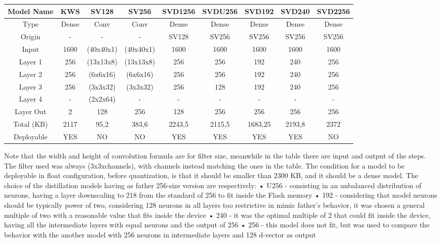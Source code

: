 \begin{table}[!h]
\centering
    \begin{tabular}{|c|c|c|c|c|c|c|c|c|}
        \hline
        Model Name & KWS & SV128 & SV256 & SVD1256 & SVDU256 & SVD192 & SVD240 & SVD2256\\
        \hline
        Type & Dense & Conv & Conv & Dense & Dense & Dense & Dense & Dense\\
        Origin & - & - &  - & SV128 & SV256 & SV256 & SV256 & SV256\\
        Input & 1600 & (40x40x1) & (40x40x1) & 1600 & 1600 & 1600 & 1600 & 1600\\
        Layer 1 & 256 & (13x13x8) & (13x13x8) & 256 & 256 & 192 & 240 & 256\\
        Layer 2 & 256 & (6x6x16) & (6x6x16) & 256 & 256 & 192 & 240 & 256\\
        Layer 3 & 256 & (3x3x32) & (3x3x32) & 256 & 128 & 192 & 240 & 256\\
        Layer 4 & - & (2x2x64) & - & - & - & - & - & -\\
        Layer Out & 2 & 128 & 256 & 128 & 256 & 256 & 256 & 256\\
        Total (KB) & 2117 & 95,2 & 383,6 & 2243,5 & 2115,5 & 1683,25 & 2193,8 & 2372\\
        Deployable & YES & NO & NO & YES & YES & YES & YES & NO\\
        \hline
    \end{tabular}
\end{table}
Note that the width and height of convolution formula are for filter size, meanwhile in the table there are input and output of the steps. The filter used was always (3x3xchannels), with channels instead matching the ones in the table. The condition for a model to be deployable in float configuration, before quantization, is that it should be smaller than 2300 KB, and it should be a dense model. The choice of the distillation models having as father 256-size version are respectively:\newline
• U256 - consisting in an unbalanced distribution of neurons, having a layer downscaling to 218 from the standard of 256 to fit inside the Flash memory\newline
• 192 - considering that model neurons should be typically power of two, considering 128 neurons in all layers too restrictive in mimic father's behavior, it was chosen a general multiple of two with a reasonable value that fits inside the device\newline
• 240 - it was the optimal multiple of 2 that could fit inside the device, having all the intermediate layers with equal neurons and the output of 256\newline
• 256 - this model does not fit, but was used to compare the behavior with the another model with 256 neurons in intermediate layers and 128 d-vector as output\newline\newline
